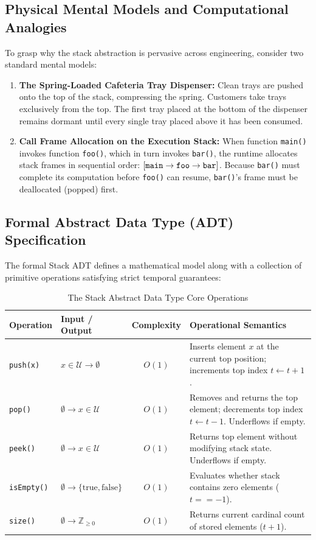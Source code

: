 \documentclass[10pt,journal,compsoc,onecolumn]{IEEEtran}
\begin{document}
\subsection{Physical Mental Models and Computational Analogies}

To grasp why the stack abstraction is pervasive across engineering, consider two standard mental models:
\begin{enumerate}
    \item \textbf{The Spring-Loaded Cafeteria Tray Dispenser:} Clean trays are pushed onto the top of the stack, compressing the spring. Customers take trays exclusively from the top. The first tray placed at the bottom of the dispenser remains dormant until every single tray placed above it has been consumed.
    \item \textbf{Call Frame Allocation on the Execution Stack:} When function \texttt{main()} invokes function \texttt{foo()}, which in turn invokes \texttt{bar()}, the runtime allocates stack frames in sequential order: $[\text{\texttt{main}} \to \text{\texttt{foo}} \to \text{\texttt{bar}}]$. Because \texttt{bar()} must complete its computation before \texttt{foo()} can resume, \texttt{bar()}'s frame must be deallocated (popped) first.
\end{enumerate}

\subsection{Formal Abstract Data Type (ADT) Specification}

The formal Stack ADT defines a mathematical model along with a collection of primitive operations satisfying strict temporal guarantees:

\begin{table}[h]
\centering
\caption{The Stack Abstract Data Type Core Operations}
\label{tab:stack_adt}
\begin{tabular}{@{}llcp{6.5cm}@{}}
\toprule
\textbf{Operation} & \textbf{Input / Output} & \textbf{Complexity} & \textbf{Operational Semantics} \\ \midrule
\texttt{push(x)} & $x \in \mathcal{U} \to \emptyset$ & $O(1)$ & Inserts element $x$ at the current top position; increments top index $t \leftarrow t + 1$. \\
\texttt{pop()} & $\emptyset \to x \in \mathcal{U}$ & $O(1)$ & Removes and returns the top element; decrements top index $t \leftarrow t - 1$. Underflows if empty. \\
\texttt{peek()} & $\emptyset \to x \in \mathcal{U}$ & $O(1)$ & Returns top element without modifying stack state. Underflows if empty. \\
\texttt{isEmpty()} & $\emptyset \to \{\text{true}, \text{false}\}$ & $O(1)$ & Evaluates whether stack contains zero elements ($t == -1$). \\
\texttt{size()} & $\emptyset \to \mathbb{Z}_{\ge 0}$ & $O(1)$ & Returns current cardinal count of stored elements ($t + 1$). \\ \bottomrule
\end{tabular}
\end{table}
\end{document}
